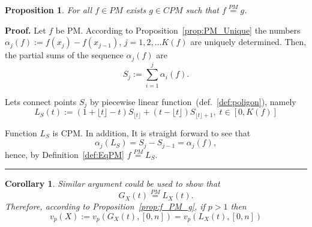 \documentclass[12pt, a4paper]{article}
\newtheorem{proposition}[theorem]{Proposition}
\newtheorem{corollary}[theorem]{Corollary}
\newenvironment{proof}[1][Proof]{\noindent \textbf{#1.} }{\  \rule{0.5em}{0.5em}}
\numberwithin{equation}{section}
\begin{document}
\begin{proposition}\label{prop:PM2CPM}
  For all $f \in PM$ exists $g \in CPM$ such that $f \stackrel{PM}{=} g$.
\end{proposition} 
\begin{proof}
  Let $f$ be PM. According to Proposition~\ref{prop:PM_Unique} the
  numbers $\alpha_j(f):=f(x_j) - f(x_{j-1})$, $j=1,2,\dots K(f)$
  are uniquely determined.
  Then, the partial sums of the sequence $\alpha_j(f)$ are
  \begin{equation}
    S_j:=\sum_{i=1}^j \alpha_i(f).
  \end{equation}    

  Lets connect points $S_j$ by 
  piecewise linear function~(def.~\ref{def:poligon}), namely
  \begin{equation}
  L_S(t) := (1+\lfloor t \rfloor-t)S_{\lfloor t \rfloor} + (t-\lfloor t \rfloor)S_{\lfloor t \rfloor+1}   ,\;t\in[0,K(f)]
  \end{equation}  
   
  Function $L_S$ is CPM. In addition, 
  It is straight forward to see that 
  \begin{equation}
  \alpha_j(L_S)=S_j-S_{j-1}=\alpha_j(f),
  \end{equation}
  hence, by Definition~\ref{def:EqPM} $f \stackrel{PM}{=} L_S$.  
\end{proof}
\begin{corollary}
  Similar argument could be used to show that
  \begin{equation}
    G_X(t)\stackrel{PM}{=}L_X(t).
  \end{equation}
  Therefore, according to Proposition~\ref{prop:f_PM_g}, if $p>1$ then
  \begin{equation}
    v_p(X) := v_p(G_X(t),[0,n])= v_p(L_X(t),[0,n])
  \end{equation}
\end{corollary}
\end{document}
